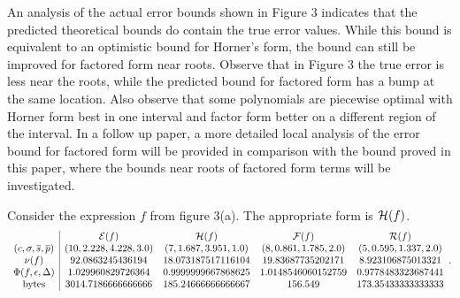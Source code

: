 \documentclass[]{elsarticle}
\begin{document}
An analysis of the actual error bounds shown in Figure 3 indicates that the predicted theoretical bounds do contain the true error values.
While this bound is equivalent to an optimistic bound for Horner's form, the bound can still be improved for factored form near roots.
Observe that in Figure 3 the true error is less near the roots, while the predicted bound for factored form has a bump at the same location.
Also observe that some polynomials are piecewise optimal with Horner form best in one interval and factor form better on a different region of the interval.
In a follow up paper, a more detailed local analysis of the error bound for factored form will be provided in comparison with the bound proved in this paper, where the bounds near roots of factored form terms will be investigated.

\begin{example}
	Consider the expression $f$ from figure 3(a).
	The appropriate form is $\mathcal{H}(f)$.
	$$\begin{array}{c|cccc}
		& \mathcal{E}(f) & \mathcal{H}(f) & \mathcal{F}(f) & \mathcal{R}(f) \\
	(c,\sigma,\overline{s},\overline{p}) & (10, 2.228, 4.228, 3.0) & (7, 1.687, 3.951, 1.0) & (8, 0.861, 1.785, 2.0) & (5, 0.595, 1.337, 2.0) \\
	\nu(f) & 92.0863245436194 & 18.073187517116104 & 19.83687735202171 & 8.923106875013321 \\
	\Phi(f,\epsilon,\Delta) & 1.029960829726364 & 0.9999999667868625 & 1.0148546060152759 & 0.9778483323687441 \\
	\text{bytes} & 3014.7186666666666 & 185.24666666666667 & 156.549 & 173.35433333333333
	\end{array}. $$
\end{example}
\end{document}
